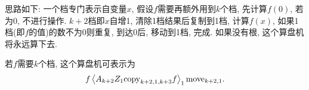 \begin{solution}
思路如下:
一个档专门表示自变量$x$, 假设$f$需要再额外用到$k$个档, 先计算$f(0)$, 若为0, 不进行操作. $k+2$档即$x$自增1, 清除1档结果后复制到1档, 计算$f(x)$, 如果1档(即$f$的值)的数不为0则重复, 到达0后,  移动到1档, 完成. 如果没有根, 这个算盘机将永远算下去.

若$f$需要$k$个档, 这个算盘机可表示为$$f\left\langle A_{k+2}Z_1\mathrm{copy}_{k+2,1,k+3}f\right\rangle_1\mathrm{move}_{k+2,1}.$$
\end{solution}